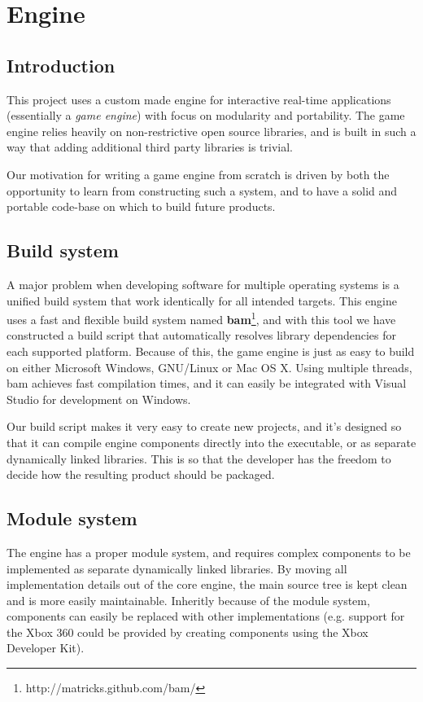 
\chapter{Engine}
\section {Introduction}
This project uses a custom made engine for interactive real-time applications (essentially a \textit{game engine}) with focus on modularity and portability. The game engine relies heavily on non-restrictive open source libraries, and is built in such a way that adding additional third party libraries is trivial.

Our motivation for writing a game engine from scratch is driven by both the opportunity to learn from
constructing such a system, and to have a solid and portable code-base on which to build future products.

\section {Build system}
A major problem when developing software for multiple operating systems is a unified build system that work
identically for all intended targets. This engine uses a fast and flexible build system named \textbf{bam}\footnote{http://matricks.github.com/bam/}, and
with this tool we have constructed a build script that automatically resolves library dependencies for each supported platform. Because of this, the game engine is just as easy to build on either Microsoft Windows, GNU/Linux or Mac OS X. Using multiple threads, bam achieves fast compilation times, and it can easily be integrated with Visual Studio for development on Windows.

Our build script makes it very easy to create new projects, and it's designed so that it can compile engine components directly into the executable, or as separate dynamically linked libraries. This is so that the developer has the freedom to decide how the resulting product should be packaged.

\newpage

\section{Module system}
The engine has a proper module system, and requires complex components to be implemented as separate dynamically linked libraries. By moving all implementation details out of the core engine, the main source tree is kept clean and is more easily maintainable. Inheritly because of the module system, components can easily be replaced with other implementations (e.g. support for the Xbox 360 could be provided
by creating components using the Xbox Developer Kit).

